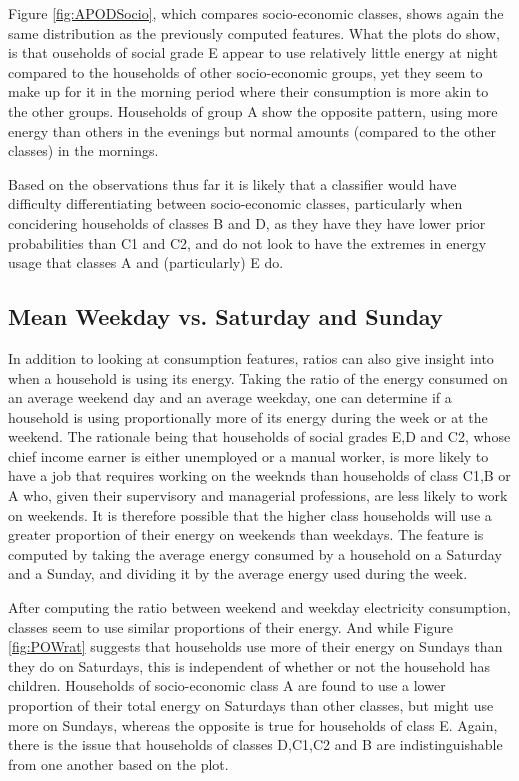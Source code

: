 \APODSocio %

Figure \ref{fig:APODSocio}, which compares socio-economic classes, shows again the same distribution as the previously computed features. What the plots do show, is that ouseholds of social grade E appear to use relatively little energy at night compared to the households of other socio-economic groups, yet they seem to make up for it in the morning period where their consumption is more akin to the other groups. Households of group A show the opposite pattern, using more energy than others in the evenings but normal amounts (compared to the other classes) in the mornings.

Based on the observations thus far it is likely that a classifier would have difficulty differentiating between socio-economic classes, particularly when concidering households of classes B and D, as they have they have lower prior probabilities than C1 and C2, and do not look to have the extremes in energy usage that classes A and (particularly) E do. 


\subsection*{Mean Weekday vs. Saturday and Sunday}
In addition to looking at consumption features, ratios can also give insight into when a household is using its energy. Taking the ratio of the energy consumed on an average weekend day and an average weekday, one can determine if a household is using proportionally more of its energy during the week or at the weekend. The rationale being that households of social grades E,D and C2, whose chief income earner is either unemployed or a manual worker, is more likely to have a job that requires working on the weeknds than households of class C1,B or A who, given their supervisory and managerial professions, are less likely to work on weekends. It is therefore possible that the higher class households will use a greater proportion of their energy on weekends than weekdays. The feature is computed by taking the average energy consumed by a household on a Saturday and a Sunday, and dividing it by the average energy used during the week.
\POWrat

After computing the ratio between weekend and weekday electricity consumption, classes seem to use similar proportions of their energy. And while Figure \ref{fig:POWrat} suggests that households use more of their energy on Sundays than they do on Saturdays, this is independent of whether or not the household has children. Households of socio-economic class A are found to use a lower proportion of their total energy on Saturdays than other classes, but might use more on Sundays, whereas the opposite is true for households of class E. Again, there is the issue that households of classes D,C1,C2 and B are indistinguishable from one another based on the plot.


